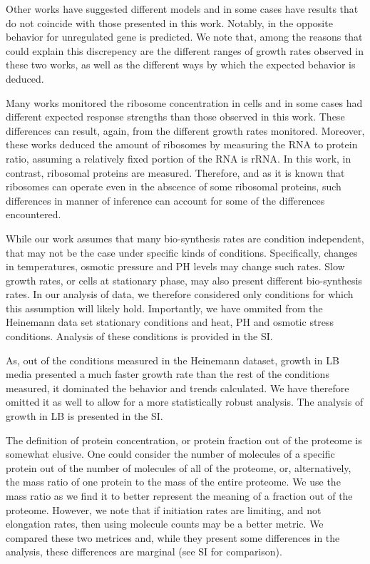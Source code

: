 \documentclass[notitlepage]{article}
\begin{document}
Other works have suggested different models and in some cases have results that do not coincide with those presented in this work.
Notably, in \parencite{Klumpp2009a} the opposite behavior for unregulated gene is predicted.
We note that, among the reasons that could explain this discrepency are the different ranges of growth rates observed in these two works, as well as the different ways by which the expected behavior is deduced.

Many works monitored the ribosome concentration in cells \parencite{Scott2010, Bremer1987, Schaechter1958, 1974, eco-sal} and in some cases had different expected response strengths than those observed in this work.
These differences can result, again, from the different growth rates monitored.
Moreover, these works deduced the amount of ribosomes by measuring the RNA to protein ratio, assuming a relatively fixed portion of the RNA is rRNA.
In this work, in contrast, ribosomal proteins are measured.
Therefore, and as it is known that ribosomes can operate even in the abscence of some ribosomal proteins, such differences in manner of inference can account for some of the differences encountered.

While our work assumes that many bio-synthesis rates are condition independent, that may not be the case under specific kinds of conditions.
Specifically, changes in temperatures, osmotic pressure and PH levels may change such rates.
Slow growth rates, or cells at stationary phase, may also present different bio-synthesis rates.
In our analysis of data, we therefore considered only conditions for which this assumption will likely hold.
Importantly, we have ommited from the Heinemann data set stationary conditions and heat, PH and osmotic stress conditions.
Analysis of these conditions is provided in the SI.

As, out of the conditions measured in the Heinemann dataset, growth in LB media presented a much faster growth rate than the rest of the conditions measured, it dominated the behavior and trends calculated.
We have therefore omitted it as well to allow for a more statistically robust analysis.
The analysis of growth in LB is presented in the SI.

The definition of protein concentration, or protein fraction out of the proteome is somewhat elusive.
One could consider the number of molecules of a specific protein out of the number of molecules of all of the proteome, or, alternatively, the mass ratio of one protein to the mass of the entire proteome.
We use the mass ratio as we find it to better represent the meaning of a fraction out of the proteome.
However, we note that if initiation rates are limiting, and not elongation rates, then using molecule counts may be a better metric.
We compared these two metrices and, while they present some differences in the analysis, these differences are marginal (see SI for comparison).
\end{document}
